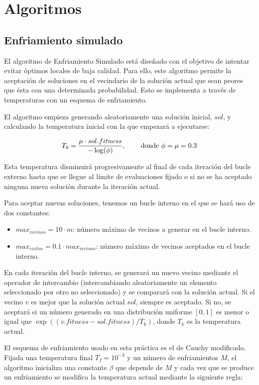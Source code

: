 \documentclass[10pt,a4paper]{article}
\begin{document}
\section{Algoritmos}

\subsection{Enfriamiento simulado}

El algoritmo de Enfriamiento Simulado está diseñado con el objetivo de intentar evitar óptimos locales de baja calidad. Para ello, este algoritmo permite la aceptación de soluciones en el vecindario de la solución actual que sean peores que ésta con una determinada probabilidad. Esto se implementa a través de temperaturas con un esquema de enfriamiento.

El algoritmo empieza generando aleatoriamente una solución inicial, $sol$, y calculando la temperatura inicial con la que empezará a ejecutarse:

$$T_0 = \frac{\mu \cdot sol.fitness}{-\log(\phi)} \text{, \qquad donde } \phi = \mu = 0.3$$

Esta temperatura disminuirá progresivamente al final de cada iteración del bucle externo hasta que se llegue al límite de evaluaciones fijado o si no se ha aceptado ninguna nueva solución durante la iteración actual.

Para aceptar nuevas soluciones, tenemos un bucle interno en el que se hará uso de dos constantes: 

\begin{itemize}
	\item $max_{vecinos} = 10 \cdot m$: número máximo de vecinos a generar en el bucle interno.
	\item $max_{exitos} = 0.1 \cdot max_{vecinos}$: número máximo de vecinos aceptados en el bucle interno.
\end{itemize}

En cada iteración del bucle interno, se generará un nuevo vecino mediante el operador de intercambio (intercambiando aleatoriamente un elemento seleccionado por otro no seleccionado) y se comparará con la solución actual. Si el vecino $v$ es mejor que la solución actual $sol$, siempre es aceptado. Si no, se aceptará si un número generado en una distribución uniforme $[0,1]$ es menor o igual que $\exp((v.fitness-sol.fitness)/T_k)$, donde $T_k$ es la temperatura actual.

El esquema de enfriamiento usado en esta práctica es el de Cauchy modificado. Fijada una temperatura final $T_f = 10^{-3}$ y un número de enfriamientos $M$, el algoritmo inicializa una constante $\beta$ que depende de $M$ y cada vez que se produce un enfriamiento se modifica la temperatura actual mediante la siguiente regla:
\end{document}
